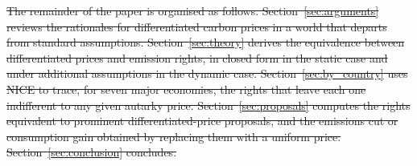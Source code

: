 \documentclass[12pt,english]{article}
\theoremstyle{remark}
\providecommand{\DIFdeltex}[1]{{\protect\color{red}\sout{#1}}}                      %
\providecommand{\DIFdelbegin}{} %
\providecommand{\DIFdelend}{} %
\providecommand{\DIFdel}[1]{\texorpdfstring{\DIFdeltex{#1}}{}} %
\newcommand{\DIFscaledelfig}{0.5}
\newlength{\DIFdelgraphicswidth} %
\newlength{\DIFdelgraphicsheight} %
\newcommand{\DIFdelincludegraphics}[2][]{%
\sbox{\DIFdelgraphicsbox}{\DIFOincludegraphics[#1]{#2}}%
\settoboxwidth{\DIFdelgraphicswidth}{\DIFdelgraphicsbox} %
\settoboxtotalheight{\DIFdelgraphicsheight}{\DIFdelgraphicsbox} %
\scalebox{\DIFscaledelfig}{%
\parbox[b]{\DIFdelgraphicswidth}{\usebox{\DIFdelgraphicsbox}\\[-\baselineskip] \rule{\DIFdelgraphicswidth}{0em}}\llap{\resizebox{\DIFdelgraphicswidth}{\DIFdelgraphicsheight}{%
\setlength{\unitlength}{\DIFdelgraphicswidth}%
\begin{picture}(1,1)%
\thicklines\linethickness{2pt} %
{\color[rgb]{1,0,0}\put(0,0){\framebox(1,1){}}}%
{\color[rgb]{1,0,0}\put(0,0){\line( 1,1){1}}}%
{\color[rgb]{1,0,0}\put(0,1){\line(1,-1){1}}}%
\end{picture}%
}\hspace*{3pt}}} %
} %
\DeclareRobustCommand{\DIFdelbegin}{\DIFOdelbegin \let\includegraphics\DIFdelincludegraphics} %
\DeclareRobustCommand{\DIFdelend}{\DIFOaddend \let\includegraphics\DIFOincludegraphics} %
\begin{document}

\DIFdelbegin \DIFdel{The remainder of the paper is organised as follows. Section~\ref{sec:arguments} reviews the rationales for differentiated carbon prices in a world that departs from standard assumptions. Section~\ref{sec:theory} derives the equivalence between differentiated prices and emission rights, in closed form in the static case and under additional assumptions in the dynamic case. Section~\ref{sec:by_country} uses NICE to trace, for seven major economies, the rights that leave each one indifferent to any given autarky price. Section~\ref{sec:proposals} computes the rights equivalent to prominent differentiated-price proposals, and the emissions cut or consumption gain obtained by replacing them with a uniform price. Section~\ref{sec:conclusion} concludes.
}\DIFdelend %
\end{document}
